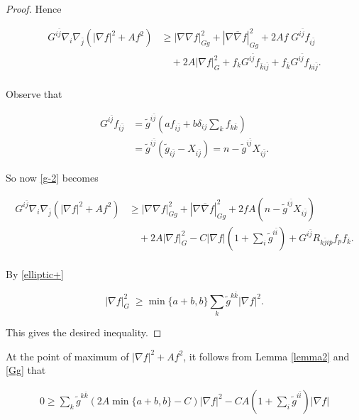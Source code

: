 \documentclass[11pt,letterpaper]{amsart}
\newcommand{\bi}{\bar{i}}
\newcommand{\bj}{\bar{j}}
\newcommand{\bk}{\bar{k}}
\newcommand{\bp}{\bar{p}}
\newcommand{\bnabla}{\overline{\nabla}}
\numberwithin{equation}{section}
\begin{document}
\begin{itemize}
\begin{proof}
Hence

\begin{equation}\label{g-2}
    \begin{aligned}
        G^{i \bj} \nabla_i \nabla_{\bj} (|\nabla f|^2 + A f^2) &\geq |\nabla \nabla f| _{Gg}^2 + |\nabla \bnabla f|_{Gg}^2 + 2 Af \; G^{i \bj} f_{i \bj}\\
        &\quad +2 A |\nabla f|_{G}^2 + f_k G^{i \bj} f_{\bk i \bj} + f_{\bk} G^{i \bj} f_{k i \bj}.\\
    \end{aligned}
\end{equation}


Observe that 

\begin{equation}\label{g-3}
\begin{aligned}
        G^{i \bj} f_{i \bj} &= \tilde g^{i \bj} (a f_{i \bj} + b \delta_{i j} \sum_k f_{k \bk})\\
    & = \tilde g^{i \bj}(\tilde g_{i \bj} - X_{i \bj}) = n- \tilde g^{i \bj} X_{i\bj}.
\end{aligned}
\end{equation}

So now \eqref{g-2} becomes


\begin{equation}
\begin{aligned}
     G^{i \bj} \nabla_i \nabla_{\bj} (|\nabla f|^2 + A f^2) &\geq |\nabla \nabla f| _{Gg}^2 + |\nabla \bnabla f|_{Gg}^2 + 2 f A(n- \tilde g^{i \bj} X_{i\bj})\\
        &\quad +2 A |\nabla f|_{G}^2 - C|\nabla f|(1+\sum_i \tilde g^{i \bi}) + G^{i \bj }R_{k \bj i \bp} f_p f_{\bk}. \\
\end{aligned}
\end{equation}

By \eqref{elliptic+}

$$|\nabla f|_{G}^2\; \geq \min\{a+b,b\} \sum_k \tilde g^{k \bk}|\nabla f|^2.$$


This gives the desired inequality.

\end{proof}

At the point of maximum of $|\nabla f|^2 + A f^2$, it follows from Lemma \ref{lemma2} and \eqref{Gg} that 

\begin{equation}
    \begin{aligned}
        0 \geq \sum_k \tilde g^{k \bk} (2A\min\{a+b, b\} -C)|\nabla f|^2 - CA(1+\sum_i \tilde g^{i \bi})|\nabla f|
    \end{aligned}
\end{equation}


\end{itemize}
\end{document}
